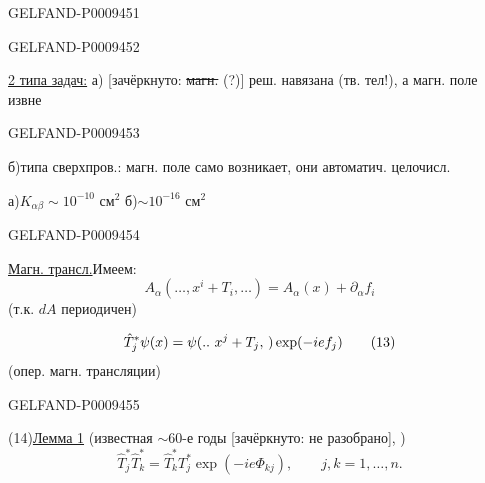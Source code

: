 \begin{GelfandAdjacentEvidence}{GELFAND-P000945}{1}

\end{GelfandAdjacentEvidence}
\begin{GelfandAdjacentEvidence}{GELFAND-P000945}{2}


\underline{2 типа задач:} а) [зачёркнуто: \sout{магн.} (?)] реш. навязана (тв. тел!), а магн. поле извне
\end{GelfandAdjacentEvidence}
\begin{GelfandAdjacentEvidence}{GELFAND-P000945}{3}


б)\enspace типа сверхпров.: магн. поле само возникает, они автоматич. целочисл.

а)\enspace $K_{\alpha\beta}\sim10^{-10}\text{ см}^2$
\qquad б)\enspace $\sim10^{-16}\text{ см}^2$
\end{GelfandAdjacentEvidence}
\begin{GelfandAdjacentEvidence}{GELFAND-P000945}{4}


\underline{Магн. трансл.}\qquad Имеем:
\begin{equation*}
 A_\alpha(\ldots,x^i+T_i,\ldots)=A_\alpha(x)+\partial_\alpha f_i
 \tag{12}
\end{equation*}
(т.к. $dA$ периодичен)

\begin{equation*}
 \hat T_j^*\psi(x)=\psi(\mathinner{..}\,x^{j}+T_j,\,)\exp(-ie f_j)
 \tag{13}
\end{equation*}
(опер. магн. трансляции)
\end{GelfandAdjacentEvidence}
\begin{GelfandAdjacentEvidence}{GELFAND-P000945}{5}


(14)\quad\underline{Лемма 1} (известная $\sim$60-е годы
[зачёркнуто: не разобрано], )
\begin{equation*}
 \hat T_j^*\hat T_k^*=\hat T_k^*T_j^*\exp(-ie\Phi_{kj}),
 \qquad j,k=1,\ldots,n.
\end{equation*}
\end{GelfandAdjacentEvidence}
